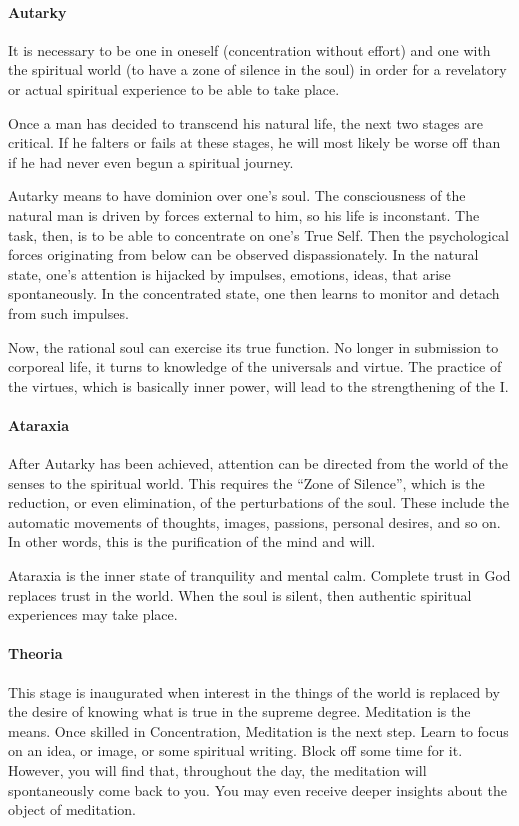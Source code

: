 \paragraph{Autarky}
\begin{quotex}
It is necessary to be one in oneself (concentration without effort) and one with the spiritual world (to have a zone of silence in the soul) in order for a revelatory or actual spiritual experience to be able to take place. 

\end{quotex}
Once a man has decided to transcend his natural life, the next two stages are critical. If he falters or fails at these stages, he will most likely be worse off than if he had never even begun a spiritual journey.

Autarky means to have dominion over one's soul. The consciousness of the natural man is driven by forces external to him, so his life is inconstant. The task, then, is to be able to concentrate on one's True Self. Then the psychological forces originating from below can be observed dispassionately. In the natural state, one's attention is hijacked by impulses, emotions, ideas, that arise spontaneously. In the concentrated state, one then learns to monitor and detach from such impulses.

Now, the rational soul can exercise its true function. No longer in submission to corporeal life, it turns to knowledge of the universals and virtue. The practice of the virtues, which is basically inner power, will lead to the strengthening of the I.

\paragraph{Ataraxia}
After Autarky has been achieved, attention can be directed from the world of the senses to the spiritual world. This requires the “Zone of Silence”, which is the reduction, or even elimination, of the perturbations of the soul. These include the automatic movements of thoughts, images, passions, personal desires, and so on. In other words, this is the purification of the mind and will.

Ataraxia is the inner state of tranquility and mental calm. Complete trust in God replaces trust in the world. When the soul is silent, then authentic spiritual experiences may take place.

\paragraph{Theoria}
This stage is inaugurated when interest in the things of the world is replaced by the desire of knowing what is true in the supreme degree. Meditation is the means. Once skilled in Concentration, Meditation is the next step. Learn to focus on an idea, or image, or some spiritual writing. Block off some time for it. However, you will find that, throughout the day, the meditation will spontaneously come back to you. You may even receive deeper insights about the object of meditation.

